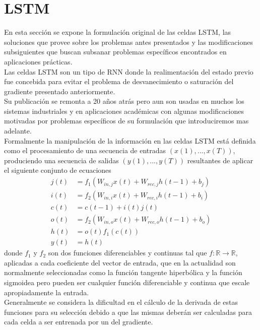 \documentclass{article}
\begin{document}
	\section{LSTM}\label{sectionLSTM}
	En esta sección se expone la formulación original de las celdas LSTM, las soluciones que provee sobre los problemas antes presentados y las modificaciones subsiguientes que buscan subsanar problemas específicos encontrados en aplicaciones prácticas.\\
	Las celdas LSTM son un tipo de RNN donde la realimentación del estado previo fue concebida para evitar el problema de desvanecimiento o saturación del gradiente presentado anteriormente. \\
	Su publicación se remonta a 20 años atrás pero aun son usadas en muchos los sistemas industriales\cite{13SpeechRecognition}\cite{12DeepSearch} y en aplicaciones académicas\cite{15TransductionGraves} con algunas modificaciones motivadas por problemas específicos de su formulación que introduciremos mas adelante.\\
	Formalmente la manipulación de la información en las celdas LSTM está definida como el procesamiento de una secuencia de entradas \textit{$(x(1) , ... , x(T))$}, produciendo una secuencia de salidas \textit{ $(y(1), ... , y(T))$} resultantes de aplicar el siguiente conjunto de ecuaciones
	\begin{equation*}
	\begin{split}
	j(t) &= f_1(W_{in, j} x(t) + W_{rec, j} h(t-1) + b_{j})\\
	i(t) &= f_2(W_{in, i} x(t) + W_{rec, i} h(t-1) + b_{i})\\
	c(t) &= c(t-1) + i(t)j(t)\\
	o(t) &= f_2(W_{in, o} x(t) + W_{rec, o} h(t-1) + b_o)\\
	h(t) &= o(t)f_1(c(t))\\
	y(t) &= h(t)
	\end{split}
	\end{equation*}
	donde $f_1$ y $f_2$ son dos funciones diferenciables y continuas tal que $f: \mathbb{R} \rightarrow \mathbb{R}$, aplicadas a cada coeficiente del vector de entrada, que en la actualidad son normalmente seleccionadas como la función tangente hiperbólica y la función sigmoidea pero pueden ser cualquier función diferenciable y continua que escale apropiadamente la entrada.\\
	Generalmente se considera la dificultad en el cálculo de la derivada de estas funciones para su selección debido a que las mismas deberán ser calculadas para cada celda a ser entrenada por un del gradiente.\\
\end{document}
